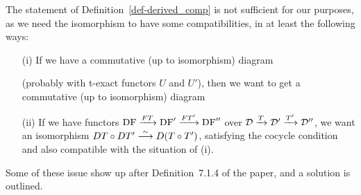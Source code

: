 \begin{remark}
The statement of Definition~\ref{def-derived_comp} is not sufficient for our purposes, as we 
need the isomorphism to have some compatibilities, in at least the following ways:
\begin{itemize}
\item[(i)] If we have a commutative (up to isomorphism) diagram 
(probably with t-exact functors $U$ and $U'$),
then we want to get a commutative (up to isomorphism) diagram

\item[(ii)] If we have functors $\operatorname{DF}\xrightarrow{FT}\operatorname{DF}'\xrightarrow{FT'}\operatorname{DF}''$ over $\mathcal{D}\xrightarrow{T}\mathcal{D}'\xrightarrow{T'}\mathcal{D}''$,
we want an isomorphism $DT\circ DT'\stackrel{\sim}{\longrightarrow} D(T\circ T')$, satisfying the cocycle condition and also
compatible with the situation of (i).

\end{itemize}

Some of these issue show up after Definition~7.1.4 of the paper, and a solution is outlined.

\end{remark}